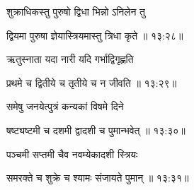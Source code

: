 {\devanagarifont शुक्राधिकस्तु पुरुषो द्विधा भिन्नो ऽनिलेन तु \thinspace{\dandab} \dontdisplaylinenum }%


{\devanagarifont द्वियमा पुरुषा ज्ञेयास्त्रियमास्तु त्रिधा कृते {॥ १३:२८॥} \veg\dontdisplaylinenum }%

{\devanagarifont ऋतुस्नाता यदा नारी यदि गर्भाद्विगृह्णति \thinspace{\dandab} \dontdisplaylinenum }%


{\devanagarifont प्रथमे च द्वितीये च तृतीये च न जीवति {॥ १३:२९॥} \veg\dontdisplaylinenum }%

{\devanagarifont समेषु जनयेत्पुत्रं कन्यकां विषमे दिने \thinspace{\dandab} \dontdisplaylinenum }%


{\devanagarifont षष्ट्यष्टमी च दशमी द्वादशी च पुमान्भवेत् {॥ १३:३०॥} \veg\dontdisplaylinenum }%

{\devanagarifont पञ्चमी सप्तमी चैव नवम्येकादशी स्त्रियः \thinspace{\dandab} \dontdisplaylinenum }%


{\devanagarifont समरक्ते च शुक्रे च श्यामः संजायते पुमान् {॥ १३:३१॥} \veg\dontdisplaylinenum }%
 

